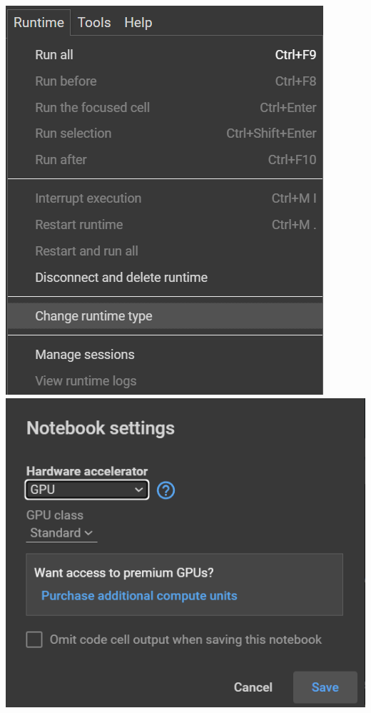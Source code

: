 \documentclass[11pt]{report}
\begin{document}
\begin{center}
    \includegraphics[scale=0.3]{runtime.png}
    \includegraphics[scale=0.4]{runtimegpu.png}
\end{center}
\end{document}
